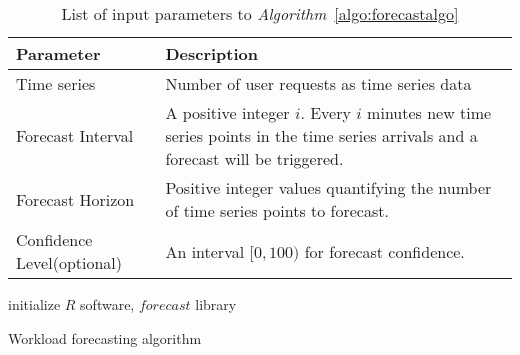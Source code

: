 \begin{flushleft}
  \begin{table}
    \begin{tabular}{ | L{5cm} | L{5cm} |}
      \hline
      Parameter & Description \\ \hline
      Time series & Number of user requests as time series data \\ \hline
      Forecast Interval & A positive integer \(i\). Every \(i\) minutes new time series points in the time series arrivals and a forecast will be triggered. \\ \hline
      Forecast Horizon & Positive integer values quantifying the number of time series points to forecast.  \\ \hline
      Confidence Level(optional)  & An interval \([0,100)\) for forecast confidence.\\ \hline
    \end{tabular}
    \caption{List of input parameters to \textit{Algorithm}~\ref{algo:forecastalgo}}
     \label{table:forecastparameter}
\end{table}
\end{flushleft}

\LinesNumbered
\begin{algorithm}[H]
 initialize \(R\) software, \(forecast\) library \;
  \caption{Workload forecasting algorithm}
  \label{algo:forecastalgo}
 \end{algorithm}

